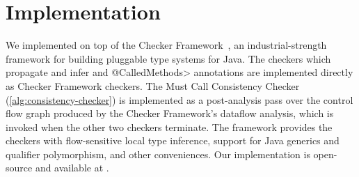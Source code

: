 \section{Implementation}
\label{sec:implementation}

We implemented \Tool on top of the Checker Framework~\cite{PapiACPE2008},
an industrial-strength framework for building pluggable type systems
for Java. The checkers which propagate and infer \MustCall and
\<@CalledMethods> annotations are implemented
directly as Checker Framework checkers.  The Must Call Consistency
Checker (\cref{alg:consistency-checker}) is
implemented as a post-analysis pass over the control flow graph
produced by the Checker Framework's dataflow analysis, which is invoked
when the other two checkers terminate. The framework provides the
checkers with flow-sensitive local type
inference, support for Java generics and qualifier polymorphism, and
other conveniences. Our implementation is open-source and available
at .
